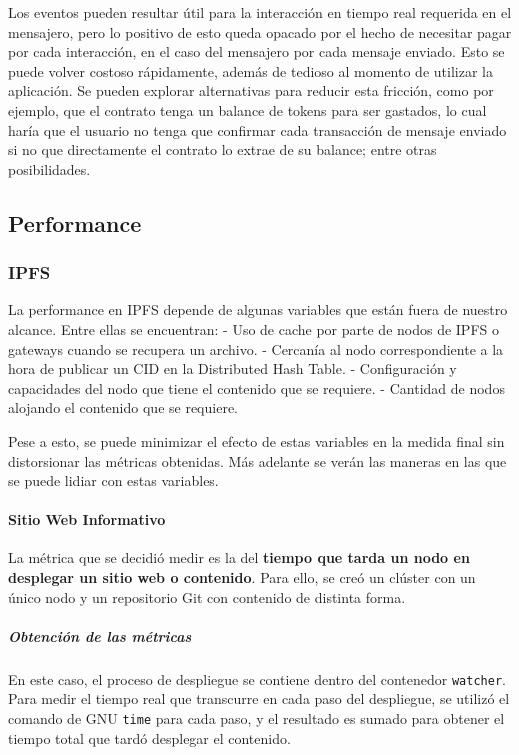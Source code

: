 Los eventos pueden resultar útil para la interacción en tiempo real requerida en el mensajero, pero lo positivo de esto queda opacado por el hecho de necesitar pagar por cada interacción, en el caso del mensajero por cada mensaje enviado. Esto se puede volver costoso rápidamente, además de tedioso al momento de utilizar la aplicación. Se pueden explorar alternativas para reducir esta fricción, como por ejemplo, que el contrato tenga un balance de tokens para ser gastados, lo cual haría que el usuario no tenga que confirmar cada transacción de mensaje enviado si no que directamente el contrato lo extrae de su balance; entre otras posibilidades.

\subsection{Performance}

\subsubsection{IPFS}

La performance en IPFS depende de algunas variables que están fuera de nuestro alcance. Entre ellas se encuentran:
 - Uso de cache por parte de nodos de IPFS o gateways cuando se recupera un archivo.
 - Cercanía al nodo correspondiente a la hora de publicar un CID en la Distributed Hash Table.
 - Configuración y capacidades del nodo que tiene el contenido que se requiere.
 - Cantidad de nodos alojando el contenido que se requiere.

 Pese a esto, se puede minimizar el efecto de estas variables en la medida final sin distorsionar las métricas obtenidas. Más adelante se verán las maneras en las que se puede lidiar con estas variables.

\paragraph{Sitio Web Informativo}
La métrica que se decidió medir es la del \textbf{tiempo que tarda un nodo en desplegar un sitio web o contenido}. Para ello, se creó un clúster con un único nodo y un repositorio Git con contenido de distinta forma.

\subparagraph{Obtención de las métricas} En este caso, el proceso de despliegue se contiene dentro del contenedor \texttt{watcher}. Para medir el tiempo real que transcurre en cada paso del despliegue, se utilizó el comando de GNU \texttt{time} para cada paso, y el resultado es sumado para obtener el tiempo total que tardó desplegar el contenido.

